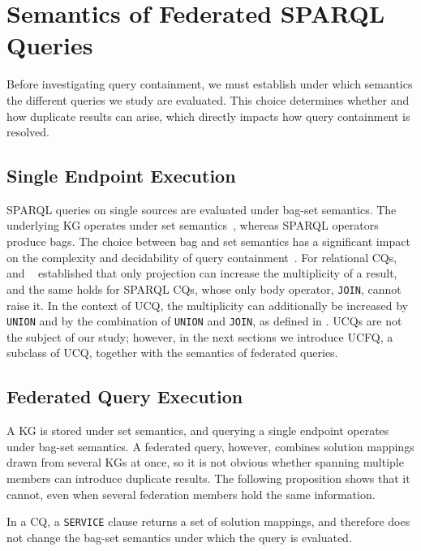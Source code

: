 \section{Semantics of Federated SPARQL Queries}\label{sec:semantic_federated_q}

Before investigating query containment, we must establish under which semantics the different queries we study are evaluated.
This choice determines whether and how duplicate results can arise, which directly impacts how query containment is resolved.

\subsection{Single Endpoint Execution}\label{sec:single_endpoint}
SPARQL queries on single sources are evaluated under bag-set semantics.
The underlying \ac{KG} operates under set semantics~\cite{w3ConceptsAbstract}, whereas SPARQL operators produce bags.
The choice between bag and set semantics has a significant impact on the complexity and decidability of query containment~\cite{Chaudhuri1993}.
For relational \acp{CQ}, \citeauthor{Chaudhuri1993}~\cite{Chaudhuri1993} and \citeauthor{Afrati2010}~\cite{Afrati2010} established that only projection can increase the multiplicity of a result, and the same holds for SPARQL \acp{CQ}, whose only body operator, \texttt{JOIN}, cannot raise it.
In the context of \ac{UCQ}, the multiplicity can additionally be increased by \texttt{UNION} and by the combination of \texttt{UNION} and \texttt{JOIN}, as defined in .
\acp{UCQ} are not the subject of our study; however, in the next sections we introduce \ac{UCFQ}, a subclass of \ac{UCQ}, together with the semantics of federated queries.



\subsection{Federated Query Execution}
A \ac{KG} is stored under set semantics, and querying a single endpoint operates under bag-set semantics.
A federated query, however, combines solution mappings drawn from several \acp{KG} at once, so it is not obvious whether spanning multiple members can introduce duplicate results.
The following proposition shows that it cannot, even when several federation members hold the same information.

\begin{proposition}\label{prop_service_bag_set}
  In a \ac{CQ}, a \texttt{SERVICE} clause returns a set of solution mappings, and therefore does not change the bag-set semantics under which the query is evaluated.
\end{proposition}

